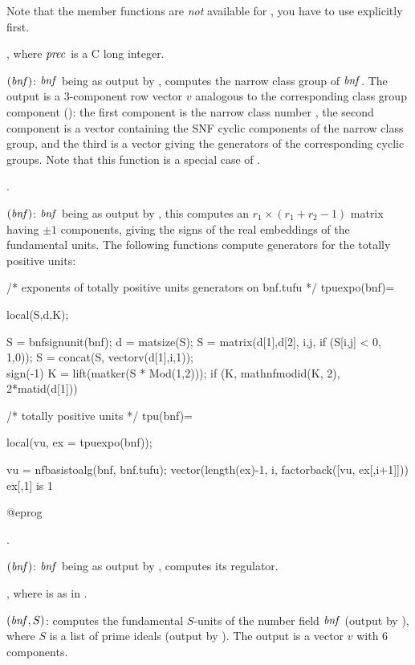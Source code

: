 Note that the member functions are \emph{not} available for , you
have to use  explicitly first.

, where $\hbox{\it prec\/}$ is a
C long integer.

$(\hbox{\it bnf\/})$: $\hbox{\it bnf\/}$ being as output by
, computes the narrow class group of $\hbox{\it bnf\/}$. The output is
a 3-component row vector $v$ analogous to the corresponding class group
component  (): the first component
is the narrow class number , the second component is a vector
containing the SNF cyclic components  of
the narrow class group, and the third is a vector giving the generators of
the corresponding  cyclic groups. Note that this function is a
special case of .

.

$(\hbox{\it bnf\/})$: $\hbox{\it bnf\/}$ being as output by
, this computes an $r_1\times(r_1+r_2-1)$ matrix having $\pm1$
components, giving the signs of the real embeddings of the fundamental units.
The following functions compute generators for the totally positive units:

\bprog
/* exponents of totally positive units generators on bnf.tufu */
tpuexpo(bnf)=
{ local(S,d,K);

  S = bnfsignunit(bnf); d = matsize(S);
  S = matrix(d[1],d[2], i,j, if (S[i,j] < 0, 1,0));
  S = concat(S, vectorv(d[1],i,1));   \\ sign(-1)
  K = lift(matker(S * Mod(1,2)));
  if (K, mathnfmodid(K, 2), 2*matid(d[1]))
}

/* totally positive units */
tpu(bnf)=
{ local(vu, ex = tpuexpo(bnf));

  vu = nfbasistoalg(bnf, bnf.tufu);
  vector(length(ex)-1, i, factorback([vu, ex[,i+1]]))  \\ ex[,1] is 1
}
@eprog

.

$(\hbox{\it bnf\/})$: $\hbox{\it bnf\/}$ being as output by
, computes its regulator.

, where  is as in
.

$(\hbox{\it bnf\/},S)$: computes the fundamental $S$-units of the
number field $\hbox{\it bnf\/}$ (output by ), where $S$ is a list of
prime ideals (output by ). The output is a vector $v$ with
6 components.

